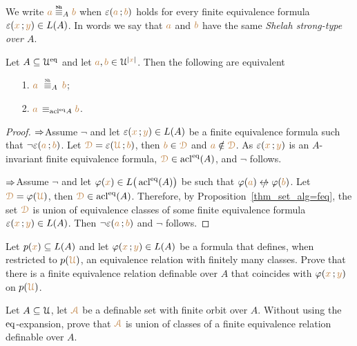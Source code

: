 \documentclass[creche.tex]{subfiles}
\begin{document}
\begin{definition}\label{def_Sh_strong_type}
We write \emph{${\mr a}\stackrel{\smash{\scalebox{.5}{\rm\bf Sh}}}{\equiv}_A{\mr b}$} when $\varepsilon({\color{brown} a}\,;{\color{brown} b})$ holds for every finite equivalence formula $\varepsilon({\color{brown} x}\,;{\color{brown} y})\in L(A)$. In words we say that ${\color{brown} a}$ and ${\color{brown} b}$ have the same \emph{Shelah strong-type over $A$}.\QED
\end{definition}

\begin{proposition}\label{prop_Shelah_strong_types}
Let $A\subseteq\EuScript U^{{\rm eq}}$ and let ${\color{brown} a},{\color{brown} b}\in\EuScript U^{|{\color{brown} x}|}$. Then the following are equivalent\nobreak
\begin{itemize}
\item[1.]  ${\mr a}\ \equivSh_A\, {\mr b}$;
\item[2.]  ${\color{brown} a}\,\equiv_{\mathop{\rm acl}^{{\rm eq}}\! A}{\color{brown} b}$.
\end{itemize} 
\end{proposition}
\begin{proof}
$\Rightarrow$\quad Assume $\neg$ and let $\varepsilon({\color{brown} x}\,;{\color{brown} y})\in L(A)$ be a finite equivalence formula such that $\neg\varepsilon({\color{brown} a}\,;{\color{brown} b})$. Let ${\color{brown}\EuScript D}=\varepsilon({\color{brown}\EuScript U}\,;{\color{brown} b})$, then  ${\color{brown} b}\in{\color{brown}\EuScript D}$ and ${\color{brown} a}\notin{\color{brown}\EuScript D}$. As $\varepsilon({\color{brown} x}\,;{\color{brown} y})$ is an $A$-invariant finite equivalence formula, ${\color{brown}\EuScript D}\in\mathop{\rm acl}^{{\rm eq}}(A)$, and $\neg$ follows. 

$\Rightarrow$\quad Assume $\neg$ and let $\varphi({\color{brown} x})\in L\big(\mathop{\rm acl}^{{\rm eq}}(A)\big)$ be  such that $\phi({\mr a})\niff\phi({\mr b})$. Let ${\color{brown}\EuScript D}=\varphi({\color{brown}\EuScript U})$, then ${\color{brown}\EuScript D}\in\mathop{\rm acl}^{{\rm eq}}(A)$. Therefore, by Proposition~\ref{thm_set_alg=feq}, the set ${\color{brown}\EuScript D}$ is union of equivalence classes of some finite equivalence formula $\varepsilon({\color{brown} x}\,;{\color{brown} y})\in L(A)$. Then $\neg\varepsilon({\color{brown} a}\,;{\color{brown} b})$ and $\neg$ follows.
\end{proof}

\begin{exercise}
Let $p({\color{brown} x})\subseteq L(A)$ and let $\varphi({\color{brown} x}\,;{\color{brown} y})\in L(A)$ be a formula that defines, when restricted to $p({\color{brown}\EuScript U})$, an equivalence relation with finitely many classes. Prove that there is a finite equivalence relation definable over $A$ that coincides with $\varphi({\color{brown} x}\,;{\color{brown} y})$ on $p({\color{brown}\EuScript U})$.\QED
\end{exercise}

\begin{exercise}\label{ex_feqthm_senza_eq}
Let $A\subseteq\EuScript U$, let ${\color{brown}\EuScript A}$ be a definable set with finite orbit over $A$. Without using the ${{\rm eq}}$-expansion, prove that ${\color{brown}\EuScript A}$ is union of classes of a finite equivalence relation definable over $A$.\QED
\end{exercise}
\end{document}
